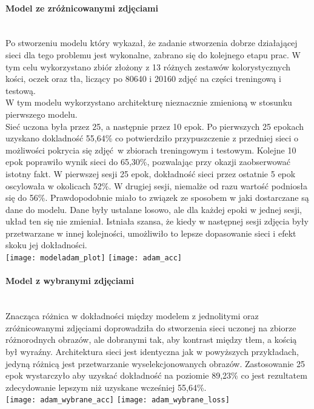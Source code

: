\paragraph{Model ze zróżnicowanymi zdjęciami} \mbox{}\\
Po stworzeniu modelu który wykazał, że zadanie stworzenia dobrze działającej sieci dla
tego problemu jest wykonalne, zabrano się do kolejnego etapu prac. W tym celu
wykorzystano zbiór złożony z 13 różnych zestawów kolorystycznych kości, oczek oraz tła,
liczący po 80640 i 20160 zdjęć na części treningową i testową.\\
W tym modelu wykorzystano architekturę nieznacznie zmienioną w stosunku pierwszego modelu.\\
Sieć uczona była przez 25, a następnie przez 10 epok.
Po pierwszych 25 epokach uzyskano dokladność 55,64\% co potwierdziło przypuszczenie
z przedniej sieci o możliwości pokrycia się zdjęć w zbiorach treningowym i testowym.
Kolejne 10 epok poprawiło wynik sieci do 65,30\%, pozwalając przy okazji zaobserwować
istotny fakt. W pierwszej sesji 25 epok, dokładność sieci przez ostatnie
5 epok oscylowała w okolicach 52\%. W drugiej sesji, niemalże od razu wartość
podniosła się do 56\%. Prawdopodobnie miało to związek ze sposobem w jaki dostarczane
są dane do modelu. Dane były ustalane losowo, ale dla każdej epoki w jednej sesji,
układ ten się nie zmieniał. Istniała szansa, że kiedy w następnej sesji zdjęcia
były przetwarzane w innej kolejności, umożliwiło to lepsze dopasowanie sieci i efekt
skoku jej dokładności.\\
\texttt{[image: modeladam\_plot]}
\texttt{[image: adam\_acc]}

\paragraph{Model z wybranymi zdjęciami} \mbox{}\\
Znacząca różnica w dokładności między modelem z jednolitymi oraz zróżnicowanymi zdjęciami
doprowadziła do stworzenia sieci uczonej na zbiorze różnorodnych obrazów, ale
dobranymi tak, aby kontrast między tłem, a kością był wyraźny. Architektura sieci
jest identyczna jak w powyższych przykładach, jedyną różnicą jest przetwarzanie
wyselekcjonowanych obrazów. Zastosowanie 25 epok wystarczyło aby uzyskać dokładność
na poziomie 89,23\% co jest rezultatem zdecydowanie lepszym niż uzyskane wcześniej 55,64\%.\\
\texttt{[image: adam\_wybrane\_acc]}
\texttt{[image: adam\_wybrane\_loss]}

